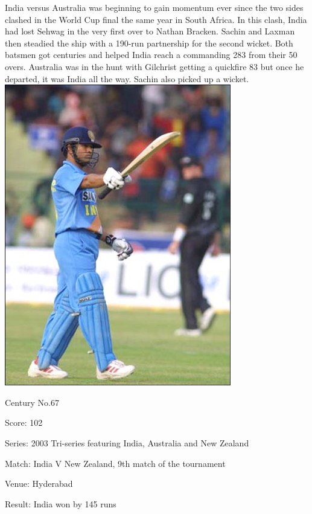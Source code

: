\documentclass[11pt, a4paper]{article}
\begin{document}
India versus Australia was beginning to gain momentum ever since the two sides clashed in the World Cup final the same year in South Africa. In this clash, India had lost Sehwag in the very first over to Nathan Bracken. Sachin and Laxman then steadied the ship with a 190-run partnership for the second wicket. Both batsmen got centuries and helped India reach a commanding 283 from their 50 overs. Australia was in the hunt with Gilchrist getting a quickfire 83 but once he departed, it was India all the way. Sachin also picked up a wicket. 
\newpage
\includegraphics[height=0.7\textheight]{pics/67.jpg}

Century No.67 

Score: 102 

Series: 2003 Tri-series featuring India, Australia and New Zealand 

Match: India V New Zealand, 9th match of the tournament 

Venue: Hyderabad 

Result: India won by 145 runs 
\end{document}
